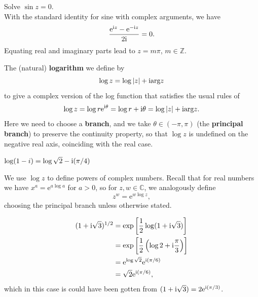 \documentclass[letter-paper]{tufte-book}
\newenvironment{example}[1][Example]{\begin{trivlist}
\item[\hskip \labelsep {\bfseries #1}]}{\end{trivlist}}
\newcommand{\ex}{\mathrm{e}}
\newcommand{\zi}{{\rm i}}
\newcommand\Def[1]{\textbf{#1}}
\begin{document}
\begin{example}
  Solve $\sin z = 0$.\\
  
  With the standard identity for sine with complex arguments, we have
  \begin{equation*}
    \frac{\ex^{\zi z} - \ex^{-\zi z}}{2\zi} = 0.
  \end{equation*}
  Equating real and imaginary parts lead to $z = m\pi$, $m \in \mathbb{Z}$.
\end{example}

The (natural) \Def{logarithm} we define by
\begin{equation}
  \log z = \log|z| + \zi \mbox{arg}z
\end{equation}
to give a complex version of the log function that satisfies the usual rules of
\begin{equation*}
  \log z = \log r\ex^{\zi\theta} = \log r + \zi \theta = \log|z| + \zi \mbox{arg}z.
\end{equation*}
Here we need to choose a \Def{branch}, and we take $\theta\in(-\pi, \pi)$ (the
\Def{principal branch}) to preserve the continuity property, so that $\log z$ is
undefined on the negative real axis, coinciding with the real case.

\begin{example}
  $\log(1-i) = \log\sqrt{2} - \zi(\pi / 4)$
\end{example}

We use $\log z$ to define powers of complex numbers. Recall that for real
numbers we have $x^a = \ex^{a \log a}$ for $a>0$, so for $z,w \in \mathbb{C}$,
we analogously define 
\begin{equation}
  z^w = \ex^{w \log z},
\end{equation}
choosing the principal branch unless otherwise stated.

\begin{example}
  \begin{align*}
    (1 + \zi \sqrt{3})^{1/2} &= \exp\left[\frac{1}{2} \log(1 + \zi \sqrt{3})\right] \\
    &= \exp\left[\frac{1}{2} \left(\log 2 + \zi\frac{\pi}{3}\right)\right] \\
    &= \ex^{\log \sqrt{2}} \ex^{\zi(\pi/6)} \\
    &= \sqrt{2}\ex^{\zi(\pi/6)},
  \end{align*}
  which in this case is could have been gotten from $(1 + \zi \sqrt{3}) = 2\ex^{\zi(\pi/3)}$.
\end{example}
\end{document}
